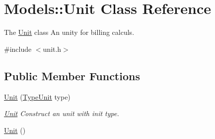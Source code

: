 \hypertarget{classModels_1_1Unit}{}\section{Models\+:\+:Unit Class Reference}
\label{classModels_1_1Unit}


The \hyperlink{classModels_1_1Unit}{Unit} class An unity for billing calculs.  




{\ttfamily \#include $<$unit.\+h$>$}

\subsection*{Public Member Functions}
\begin{DoxyCompactItemize}
\item 
\hyperlink{classModels_1_1Unit_ab6dc4f5dd689927604f3ac168f3c1552}{Unit} (\hyperlink{namespaceModels_a999532b323a4b63ff54013326c83f040}{Type\+Unit} type)
\begin{DoxyCompactList}\small\item\em \hyperlink{classModels_1_1Unit}{Unit} Construct an unit with init type. \end{DoxyCompactList}\item 
\hypertarget{classModels_1_1Unit_a34e1eddc3b72967266106fa506fb583c}{}\hyperlink{classModels_1_1Unit_a34e1eddc3b72967266106fa506fb583c}{Unit} ()\label{classModels_1_1Unit_a34e1eddc3b72967266106fa506fb583c}


\end{DoxyCompactItemize}
